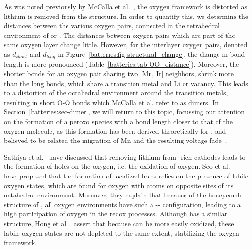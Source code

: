\begin{refsection}
As was noted previously by McCalla et al.~\cite{McCalla2015}, the oxygen framework is distorted as lithium is removed from the structure. In order to quantify this, we determine the distances between the various oxygen pairs, connected in the tetrahedral environment of  or . The distances between oxygen pairs which are part of the same oxygen layer change little. However, for the interlayer oxygen pairs, denoted as $d_{short}$ and $d_{long}$ in Figure~\ref{batteries:fig-structural_change}, the change in bond length is more pronounced (Table~\ref{batteries:tab-OO_distance}). Moreover, the shorter bonds for an oxygen pair sharing two [Mn, Ir] neighbors, shrink more than the long bonds, which share a transition metal and Li or vacancy. This leads to a distortion of the octahedral environment around the transition metals, resulting in short O-O bonds which McCalla et al. refer to as dimers. In Section~\ref{batteries:sec-dimer}, we will return to this topic, focussing our attention on the formation of a peroxo species with a bond length closer to that of the oxygen molecule, as this formation has been derived theoretically for , and believed to be related the migration of Mn and the resulting voltage fade~\cite{Chen2016}.



Sathiya et al.~\cite{Sathiya2013} have discussed that removing lithium from -rich cathodes leads to the formation of holes on the oxygen, i.e. the oxidation of oxygen. Seo et al.~\cite{Seo2016} have proposed that the formation of localized holes relies on the presence of labile oxygen states, which are found for oxygen with  atoms on opposite sites of its octahedral environment. Moreover, they explain that because of the honeycomb structure of , all oxygen environments have such a -- configuration, leading to a high participation of oxygen in the redox processes. Although  has a similar structure, Hong et al.~\cite{Hong2019} assert that because  can be more easily oxidized, these labile oxygen states are not depleted to the same extent, stabilizing the oxygen framework.


\end{refsection}
